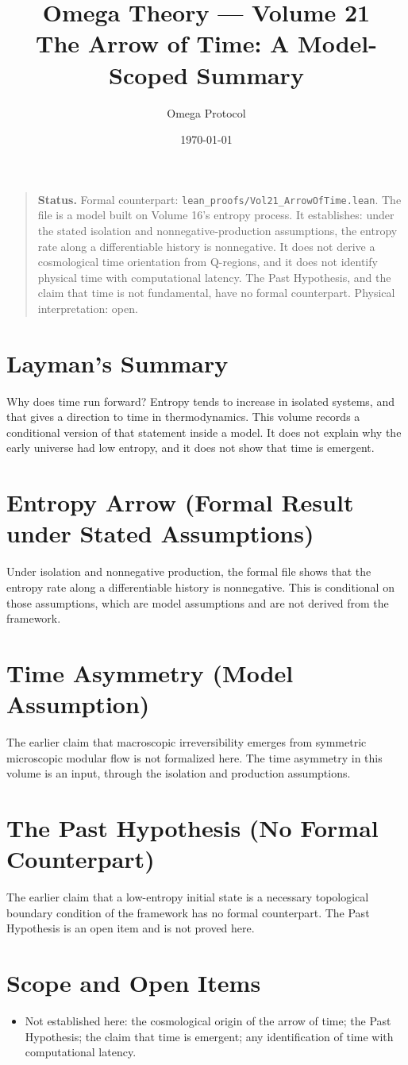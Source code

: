 \documentclass[11pt, a4paper]{article}
\title{Omega Theory --- Volume 21\\\Large The Arrow of Time: A Model-Scoped Summary}
\author{Omega Protocol}
\date{\today}
\begin{document}
\maketitle

\begin{quote}
\textbf{Status.} Formal counterpart: \texttt{lean\_proofs/Vol21\_ArrowOfTime.lean}. The file is a model built on Volume 16's entropy process. It establishes: under the stated isolation and nonnegative-production assumptions, the entropy rate along a differentiable history is nonnegative. It does not derive a cosmological time orientation from Q-regions, and it does not identify physical time with computational latency. The Past Hypothesis, and the claim that time is not fundamental, have no formal counterpart. Physical interpretation: open.
\end{quote}

\section*{Layman's Summary}
Why does time run forward? Entropy tends to increase in isolated systems, and that gives a direction to time in thermodynamics. This volume records a conditional version of that statement inside a model. It does not explain why the early universe had low entropy, and it does not show that time is emergent.

\section{Entropy Arrow (Formal Result under Stated Assumptions)}
Under isolation and nonnegative production, the formal file shows that the entropy rate along a differentiable history is nonnegative. This is conditional on those assumptions, which are model assumptions and are not derived from the framework.

\section{Time Asymmetry (Model Assumption)}
The earlier claim that macroscopic irreversibility emerges from symmetric microscopic modular flow is not formalized here. The time asymmetry in this volume is an input, through the isolation and production assumptions.

\section{The Past Hypothesis (No Formal Counterpart)}
The earlier claim that a low-entropy initial state is a necessary topological boundary condition of the framework has no formal counterpart. The Past Hypothesis is an open item and is not proved here.

\section{Scope and Open Items}
\begin{itemize}
  \item Not established here: the cosmological origin of the arrow of time; the Past Hypothesis; the claim that time is emergent; any identification of time with computational latency.
\end{itemize}
\end{document}
